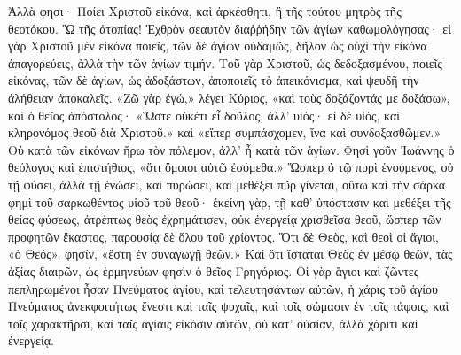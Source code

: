 \documentclass[10pt]{book}
\newcommand{\switchgreek}[1][]{\selectlanguage{polutonikogreek} \switchcolumn*[#1]}
\newcommand{\switchenglish}{\selectlanguage{english} \switchcolumn}
\begin{document}
\begin{paracol}{2}
\switchgreek

Ἀλλὰ φησι· Ποίει Χριστοῦ εἰκόνα, καὶ ἀρκέσθητι, ἢ τῆς τούτου μητρὸς τῆς θεοτόκου.
Ὢ τῆς ἀτοπίας!
Ἐχθρὸν σεαυτὸν διαῥῥήδην τῶν ἁγίων καθωμολόγησας· εἰ γὰρ Χριστοῦ μὲν εἰκόνα ποιεῖς, τῶν δὲ ἁγίων οὐδαμῶς, δῆλον ὡς οὐχὶ τὴν εἰκόνα ἀπαγορεύεις, ἀλλὰ τὴν τῶν ἁγίων τιμήν.
Τοῦ γὰρ Χριστοῦ, ὡς δεδοξασμένου, ποιεῖς εἰκόνας, τῶν δὲ ἁγίων, ὡς ἀδοξάστων, ἀποποιεῖς τὸ ἀπεικόνισμα, καὶ ψευδῆ τὴν ἀλήθειαν ἀποκαλεῖς.
«Ζῶ γὰρ ἐγώ,» λέγει Κύριος, «καὶ τοὺς δοξάζοντάς με δοξάσω», καὶ ὁ θεῖος ἀπόστολος· «Ὥστε οὐκέτι εἶ δοῦλος, ἀλλ’ υἱός· εἰ δὲ υἱός, καὶ κληρονόμος θεοῦ διὰ Χριστοῦ.» καὶ «εἴπερ συμπάσχομεν, ἵνα καὶ συνδοξασθῶμεν.» Οὐ κατὰ τῶν εἰκόνων ἤρω τὸν πόλεμον, ἀλλ’ ἦ κατὰ τῶν ἁγίων.
Φησὶ γοῦν Ἰωάννης ὁ θεόλογος καὶ ἐπιστήθιος, «ὅτι ὅμοιοι αὐτῷ ἐσόμεθα.» Ὥσπερ ὁ τῷ πυρὶ ἑνούμενος, οὐ τῇ φύσει, ἀλλὰ τῇ ἑνώσει, καὶ πυρώσει, καὶ μεθέξει πῦρ γίνεται, οὕτω καὶ τὴν σάρκα φημὶ τοῦ σαρκωθέντος υἱοῦ τοῦ θεοῦ· ἐκείνη γὰρ, τῇ καθ’ ὑπόστασιν καὶ μεθέξει τῆς θείας φύσεως, ἀτρέπτως θεὸς ἐχρημάτισεν, οὐκ ἐνεργείᾳ χρισθεῖσα θεοῦ, ὥσπερ τῶν προφητῶν ἕκαστος, παρουσίᾳ δὲ ὅλου τοῦ χρίοντος.
Ὅτι δὲ Θεὸς, καὶ θεοὶ οἱ ἅγιοι, «ὁ Θεός», φησίν, «ἔστη ἐν συναγωγῇ θεῶν.»
Καὶ ὅτι ἵσταται Θεὸς ἐν μέσῳ θεῶν, τὰς ἀξίας διαιρῶν, ὡς ἑρμηνεύων φησὶν ὁ θεῖος Γρηγόριος.
Οἱ γὰρ ἅγιοι καὶ ζῶντες πεπληρωμένοι ἦσαν Πνεύματος ἁγίου, καὶ τελευτησάντων αὐτῶν, ἡ χάρις τοῦ ἁγίου Πνεύματος ἀνεκφοιτήτως ἔνεστι καὶ ταῖς ψυχαῖς, καὶ τοῖς σώμασιν ἐν τοῖς τάφοις, καὶ τοῖς χαρακτῆρσι, καὶ ταῖς ἁγίαις εἰκόσιν αὐτῶν, οὐ κατ’ οὐσίαν, ἀλλὰ χάριτι καὶ ἐνεργείᾳ.

\switchenglish


\end{paracol}
\end{document}
